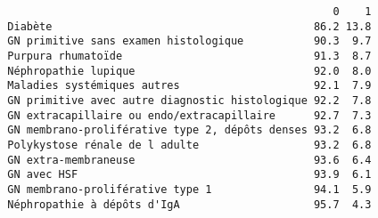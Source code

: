 \documentclass[11pt,a4paper]{article}\usepackage[]{graphicx}\usepackage[]{color}
\makeatletter
\newenvironment{kframe}{%
 \def\at@end@of@kframe{}%
 \ifinner\ifhmode%
  \def\at@end@of@kframe{\end{minipage}}%
  \begin{minipage}{\columnwidth}%
 \fi\fi%
 \def\FrameCommand##1{\hskip\@totalleftmargin \hskip-\fboxsep
 \colorbox{shadecolor}{##1}\hskip-\fboxsep
     \hskip-\linewidth \hskip-\@totalleftmargin \hskip\columnwidth}%
 \MakeFramed {\advance\hsize-\width
   \@totalleftmargin\z@ \linewidth\hsize
   \@setminipage}}%
 {\par\unskip\endMakeFramed%
 \at@end@of@kframe}
\newenvironment{knitrout}{}{} %
\makeatother
\begin{document}
\begin{knitrout}
\begin{kframe}
\begin{verbatim}
                                                     0    1
  Diabète                                         86.2 13.8
  GN primitive sans examen histologique           90.3  9.7
  Purpura rhumatoïde                              91.3  8.7
  Néphropathie lupique                            92.0  8.0
  Maladies systémiques autres                     92.1  7.9
  GN primitive avec autre diagnostic histologique 92.2  7.8
  GN extracapillaire ou endo/extracapillaire      92.7  7.3
  GN membrano-proliférative type 2, dépôts denses 93.2  6.8
  Polykystose rénale de l adulte                  93.2  6.8
  GN extra-membraneuse                            93.6  6.4
  GN avec HSF                                     93.9  6.1
  GN membrano-proliférative type 1                94.1  5.9
  Néphropathie à dépôts d'IgA                     95.7  4.3
\end{verbatim}
\end{kframe}
\end{knitrout}
\end{document}
